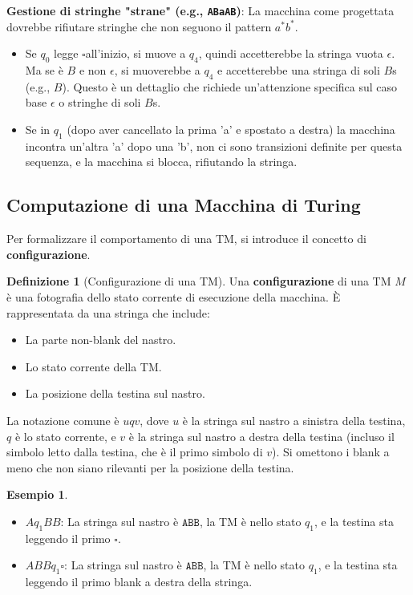 \documentclass[a4paper]{article}
\theoremstyle{definition} %
\newtheorem{definition}{Definizione}
\newtheorem{example}{Esempio}
\newcommand{\blankS}{\ensuremath{\square}}
\begin{document}
\textbf{Gestione di stringhe "strane" (e.g., \texttt{ABaAB})}:
La macchina come progettata dovrebbe rifiutare stringhe che non seguono il pattern $a^*b^*$.
\begin{itemize}
    \item Se $q_0$ legge \blankS all'inizio, si muove a $q_4$, quindi accetterebbe la stringa vuota $\epsilon$. Ma se è $B$ e non $\epsilon$, si muoverebbe a $q_4$ e accetterebbe una stringa di soli $B$s (e.g., $B$). Questo è un dettaglio che richiede un'attenzione specifica sul caso base $\epsilon$ o stringhe di soli $B$s.
    \item Se in $q_1$ (dopo aver cancellato la prima 'a' e spostato a destra) la macchina incontra un'altra 'a' dopo una 'b', non ci sono transizioni definite per questa sequenza, e la macchina si blocca, rifiutando la stringa.
\end{itemize}

\subsection{Computazione di una Macchina di Turing}
Per formalizzare il comportamento di una TM, si introduce il concetto di \textbf{configurazione}.

\begin{definition}[Configurazione di una TM]
    Una \textbf{configurazione} di una TM $M$ è una fotografia dello stato corrente di esecuzione della macchina. È rappresentata da una stringa che include:
    \begin{itemize}
        \item La parte non-blank del nastro.
        \item Lo stato corrente della TM.
        \item La posizione della testina sul nastro.
    \end{itemize}
    La notazione comune è $uqv$, dove $u$ è la stringa sul nastro a sinistra della testina, $q$ è lo stato corrente, e $v$ è la stringa sul nastro a destra della testina (incluso il simbolo letto dalla testina, che è il primo simbolo di $v$). Si omettono i blank a meno che non siano rilevanti per la posizione della testina.
    \begin{example}
        \begin{itemize}
            \item $A q_1 BB$: La stringa sul nastro è $\texttt{ABB}$, la TM è nello stato $q_1$, e la testina sta leggendo il primo $\blankS$.
            \item $ABB q_1 \blankS$: La stringa sul nastro è $\texttt{ABB}$, la TM è nello stato $q_1$, e la testina sta leggendo il primo blank a destra della stringa.
        \end{itemize}
    \end{example}
\end{definition}
\end{document}
